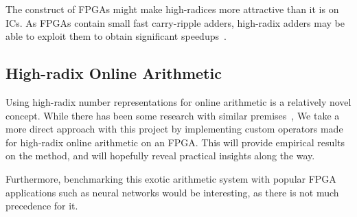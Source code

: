 The construct of FPGAs might make high-radices more attractive than it is on ICs.
As FPGAs contain small fast carry-ripple adders, high-radix adders may be able to exploit them to obtain significant speedups~\cite{Kornerup1}.

\subsection{High-radix Online Arithmetic}
Using high-radix number representations for online arithmetic is a relatively novel concept.
While there has been some research with similar premises~\cite{Lynch1}\cite{Lynch2}, We take a more direct approach with this project by implementing custom operators made for high-radix online arithmetic on an FPGA.
This will provide empirical results on the method, and will hopefully reveal practical insights along the way.

Furthermore, benchmarking this exotic arithmetic system with popular FPGA applications such as neural networks would be interesting, as there is not much precedence for it.
